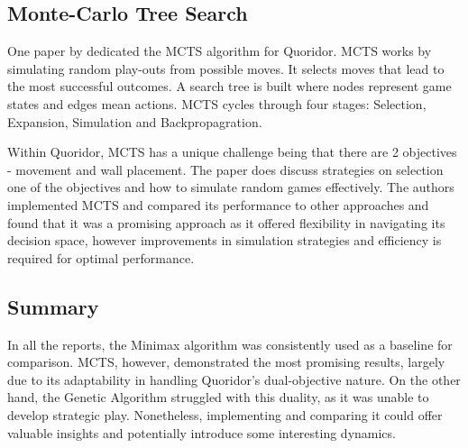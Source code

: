 \documentclass[review]{cmpreport}
\begin{document}
\subsection{Monte-Carlo Tree Search}

One paper by \cite{respall2018monte} dedicated the MCTS algorithm for Quoridor. MCTS works by simulating random play-outs from possible moves. It selects moves that lead to the most successful outcomes. A search tree is built where nodes represent game states and edges mean actions. MCTS cycles through four stages: Selection, Expansion, Simulation and Backpropagration.

\noindent Within Quoridor, MCTS has a unique challenge being that there are 2 objectives - movement and wall placement. The paper does discuss strategies on selection one of the objectives and how to simulate random games effectively. The authors implemented MCTS and compared its performance to other approaches and found that it was a promising approach as it offered flexibility in navigating its decision space, however improvements in simulation strategies and efficiency is required for optimal performance.

\subsection{Summary}
In all the reports, the Minimax algorithm was consistently used as a baseline for comparison. MCTS, however, demonstrated the most promising results, largely due to its adaptability in handling Quoridor's dual-objective nature. On the other hand, the Genetic Algorithm struggled with this duality, as it was unable to develop strategic play. Nonetheless, implementing and comparing it could offer valuable insights and potentially introduce some interesting dynamics.


\end{document}
